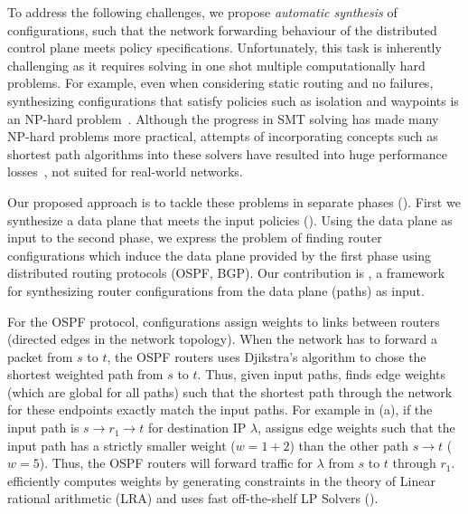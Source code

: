 To address the following challenges, we propose
\emph{automatic synthesis} of configurations, such that 
the network forwarding behaviour of the distributed
control plane meets policy specifications. 
Unfortunately, this task is inherently challenging 
as it requires solving in one shot multiple
computationally hard problems.
For example, even when considering 
static routing and no failures, 
synthesizing configurations 
that satisfy policies 
such as isolation and waypoints
is an NP-hard problem~\cite{genesis}.
Although the progress in SMT solving 
has made many NP-hard problems more practical, 
attempts of incorporating concepts such 
as shortest path algorithms 
into these solvers have resulted 
into huge performance losses~\cite{monosat}, 
not suited for real-world networks.

Our proposed approach is to tackle these problems 
in separate phases
().
First we synthesize a data plane that 
meets the input policies ().
Using the data plane as input 
to the second phase, we 
express the problem of 
finding router configurations which 
induce the data plane provided by the
first phase using distributed routing
protocols (OSPF, BGP). Our contribution 
is \name, a framework for synthesizing
router configurations from the data
plane (paths) as input. 

For the OSPF protocol, configurations assign
weights to links between routers (directed edges
in the network topology). When the network has
to forward a packet from $s$ to $t$, the
OSPF routers uses 
Djikstra's algorithm to chose the
shortest weighted path from $s$ to $t$. Thus,
given input paths, \name finds edge weights 
(which are global for all paths) such that 
the shortest path through the network
for these endpoints exactly match the input paths. 
For example in (a), if the input
path is $s\rightarrow r_1 \rightarrow t$ for
destination IP $\lambda$, \name assigns
edge weights such that the input path has a strictly
smaller weight ($w=1+2$) than the other path $s \rightarrow t$ 
($w=5$). Thus, the OSPF routers will forward traffic for
$\lambda$ from $s$ to $t$ through $r_1$. \name 
efficiently computes weights by generating constraints
in the theory of Linear rational arithmetic (LRA) and
uses fast off-the-shelf LP Solvers 
(). 

